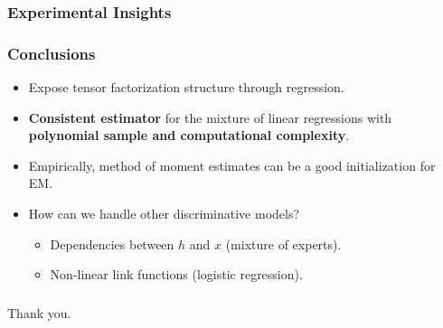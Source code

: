 \documentclass[xcolor={svgnames}]{beamer}
\begin{document}
\begin{frame}
  \frametitle{Experimental Insights}


\end{frame}


\begin{frame}
  \frametitle{Conclusions}
  \begin{itemize}
    \item<1-> Expose tensor factorization structure through regression.
    \item<2-> {\bf Consistent estimator} for the mixture of linear regressions with {\bf polynomial sample and computational complexity}.
    \item<3-> Empirically, method of moment estimates can be a good initialization for EM.
    \item<4-> How can we handle other discriminative models?
      \begin{itemize}
          \item<5-> Dependencies between $h$ and $x$ (mixture of experts).
          \item<6-> Non-linear link functions (logistic regression).
      \end{itemize}
  \end{itemize}
\end{frame}

\begin{frame}
  \frametitle{}
    Thank you.
\end{frame}
\end{document}
